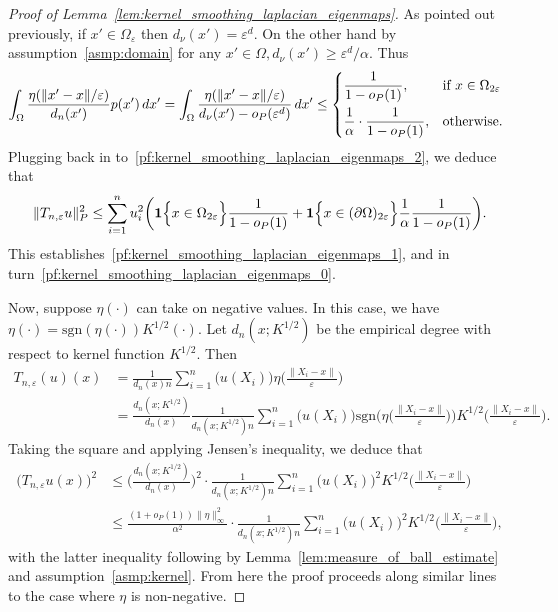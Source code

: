 \documentclass{article}
\newcommand{\1}{\mathbf{1}}
\theoremstyle{definition}
\theoremstyle{remark}
\begin{document}
\begin{proof}[Proof of Lemma~\ref{lem:kernel_smoothing_laplacian_eigenmaps}]
	As pointed out previously, if $x' \in \Omega_{\varepsilon}$ then $d_{\nu}(x') = \varepsilon^d$. On the other hand by assumption~\ref{asmp:domain} for any $x' \in \Omega, d_{\nu}(x') \geq \varepsilon^d/\alpha$. Thus 
	\begin{equation*}
	\int_{\Omega} \frac{\eta(\|x' - x\|/\varepsilon)}{d_n(x')} p(x') \,dx' = \int_{\Omega} \frac{\eta(\|x' - x\|/\varepsilon)}{d_{\nu}(x') - o_P(\varepsilon^d)} \,dx' \leq 
	\begin{dcases*}
	\frac{1}{1 - o_P(1)}, & \textrm{if $x \in \Omega_{2\varepsilon}$} \\
	\frac{1}{\alpha} \cdot \frac{1}{1 - o_P(1)}, & \textrm{otherwise.}
	\end{dcases*}
	\end{equation*}
	Plugging back in to~\eqref{pf:kernel_smoothing_laplacian_eigenmaps_2}, we deduce that
	\begin{equation*}
	\|T_{n,\varepsilon}u\|_P^2 \leq \sum_{i = 1}^{n} u_i^2 \biggl(\1\Bigl\{x \in \Omega_{2\varepsilon}\Bigr\} \frac{1}{1 - o_P(1)} + \1\Bigl\{x \in (\partial\Omega)_{2\varepsilon}\Bigr\} \frac{1}{\alpha} \frac{1}{1 - o_P(1)}\biggr).
	\end{equation*}
	This establishes~\eqref{pf:kernel_smoothing_laplacian_eigenmaps_1}, and in turn~\eqref{pf:kernel_smoothing_laplacian_eigenmaps_0}.
	
	Now, suppose $\eta(\cdot)$ can take on negative values. In this case, we have $\eta(\cdot) = \mathrm{sgn}(\eta(\cdot))K^{1/2}(\cdot)$. Let $d_n(x;K^{1/2})$ be the empirical degree with respect to kernel function $K^{1/2}$. Then
	\begin{align*}
	T_{n,\varepsilon}(u)(x) & = \frac{1}{d_n(x)n} \sum_{i = 1}^{n} \bigl(u(X_i)\bigr) \eta\biggl(\frac{\|X_i - x\|}{\varepsilon}\biggr) \\
	& = \frac{d_n(x;K^{1/2})}{d_n(x)}\frac{1}{d_n(x;K^{1/2})n} \sum_{i = 1}^{n} \bigl(u(X_i)\bigr) \mathrm{sgn}\biggl(\eta\biggl(\frac{\|X_i - x\|}{\varepsilon}\biggr)\biggr) K^{1/2}\biggl(\frac{\|X_i - x\|}{\varepsilon}\biggr).
	\end{align*}
	Taking the square and applying Jensen's inequality, we deduce that
	\begin{align*}
	\bigl(T_{n,\varepsilon}u(x)\bigr)^2 & \leq \biggl(\frac{d_n(x;K^{1/2})}{d_n(x)}\biggr)^2 \cdot \frac{1}{d_n(x;K^{1/2})n}\sum_{i = 1}^{n} \bigl(u(X_i)\bigr)^2 K^{1/2}\biggl(\frac{\|X_i - x\|}{\varepsilon}\biggr) \\
	& \leq \frac{(1 + o_P(1))\|\eta\|_{\infty}^2}{\alpha^2} \cdot \frac{1}{d_n(x;K^{1/2})n}\sum_{i = 1}^{n} \bigl(u(X_i)\bigr)^2 K^{1/2}\biggl(\frac{\|X_i - x\|}{\varepsilon}\biggr),
	\end{align*}
	with the latter inequality following by Lemma~\ref{lem:measure_of_ball_estimate} and assumption~\ref{asmp:kernel}. From here the proof proceeds along similar lines to the case where $\eta$ is non-negative.
	

\end{proof}
\end{document}
